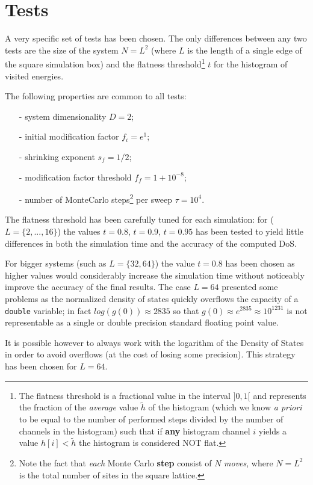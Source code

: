 \documentclass[11pt]{article}
\begin{document}
\section{Tests}

A very specific set of tests has been chosen. The only differences between any two tests are the size of the system $N=L^2$ (where $L$ is the length of a single edge of the square simulation box) and the flatness threshold\footnote{The flatness threshold is a fractional value in the interval $]0,1[$ and represents the fraction of the {\em average} value $\tilde h$ of the histogram (which we know {\em a priori} to be equal to the number of performed steps divided by the number of channels in the histogram) such that if {\bf any} histogram channel $i$ yields a value $h[i] < \tilde h$ the histogram is considered NOT flat.} $t$ for the histogram of visited energies.

The following properties are common to all tests:
\begin{itemize}
	\item[-] system dimensionality $D = 2$;
	\item[-] initial modification factor $f_i = e^1$;
	\item[-] shrinking exponent $s_f= 1/2$;
	\item[-] modification factor threshold $f_f= 1 + 10^{-8}$;
	\item[-] number of MonteCarlo steps\footnote{Note the fact that {\em each} Monte Carlo {\bf step} consist of $N$ {\em moves}, where $N=L^2$ is the total number of sites in the square lattice.} per sweep $\tau = 10^4$.
\end{itemize}

The flatness threshold has been carefully tuned for each simulation: for ($L=\{2,...,16\}$) the values $t=0.8$, $t=0.9$, $t=0.95$ has been tested to yield little differences in both the simulation time and the accuracy of the computed DoS.

For bigger systems (such as $L=\{32,64\}$) the value $t=0.8$ has been chosen as higher values would considerably increase the simulation time without noticeably improve the accuracy of the final results. The case $L=64$ presented some problems as the normalized density of states quickly overflows the capacity of a \verb|double| variable; in fact $log(g(0)) \approx 2835$ so that $g(0) \approx e^{2835} \approx 10^{1231}$ is not representable as a single or double precision standard floating point value.

It is possible however to always work with the logarithm of the Density of States in order to avoid overflows (at the cost of losing some precision). This strategy has been chosen for $L=64$.
\end{document}
